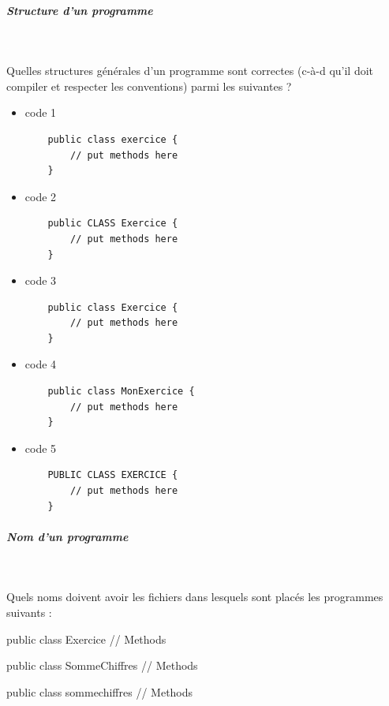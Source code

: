 \documentclass[11pt,a4paper]{article}
\begin{document}
		\subparagraph{Structure d'un programme} 
		
                \textcolor{white}{.} \par
            Quelles structures g\'en\'erales d'un programme sont correctes 
							(c-\`a-d qu'il doit compiler et respecter les conventions) parmi les suivantes ?
						
            \begin{itemize} 
        
            \item[ \ding{"6F} ]  
							code 1
							\begin{verbatim}
    public class exercice {
        // put methods here  
    }\end{verbatim}
        
            \item[ \ding{"6F} ]  
							code 2
							\begin{verbatim}
    public CLASS Exercice {
        // put methods here  
    }\end{verbatim}
        
            \item[ \ding{"6F} ] 
							code 3 
							\begin{verbatim}
    public class Exercice {  
        // put methods here  
    }\end{verbatim}
        
            \item[ \ding{"6F} ]  
							code 4 
							\begin{verbatim}
    public class MonExercice {  
        // put methods here  
    }\end{verbatim}
        
            \item[ \ding{"6F} ]  
							code 5 
							\begin{verbatim}
    PUBLIC CLASS EXERCICE { 
        // put methods here  
    }\end{verbatim}
        
            \end{itemize} 
        
			
		\subparagraph{Nom d'un programme} 
		
                \textcolor{white}{.} \par
            Quels noms doivent avoir les fichiers dans lesquels sont plac\'es les programmes suivants :\begin{Java}
    public class Exercice {  
        // Methods    
    }						\end{Java} \textcolor{gray}{\underline{\hspace*{10em}}} \begin{Java}
    public class SommeChiffres {
        // Methods    
    }						\end{Java} \textcolor{gray}{\underline{\hspace*{16em}}} \begin{Java}
    public class sommechiffres {    
        // Methods    
    }						\end{Java} \textcolor{gray}{\underline{\hspace*{16em}}} 
			
\end{document}
